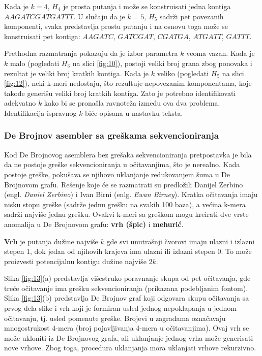 \documentclass[12pt,oneside]{memoir}
\begin{document}
Kada je $k = 4$, $H_4$ je prosta putanja i može se konstruisati jedna kontiga $AAGATCGATGATTT$. U slučaju da je $k = 5$, $H_5$ sadrži pet povezanih komponenti, svaka predstavlja prostu putanju i na osnovu toga može se konstruisati pet kontiga: $AAGATC$, $GATCGAT$, $CGATGA$, $ATGATT$, $GATTT$.

Prethodna razmatranja pokazuju da je izbor parametra $k$ veoma vazan. Kada je $k$ malo (pogledati $H_3$ na slici \ref{fig:10}), postoji veliki broj grana zbog ponovaka i rezultat je veliki broj kratkih kontiga. Kada je $k$ veliko (pogledati $H_5$ na slici \ref{fig:12}), neki k-meri nedostaju, što rezultuje nepovezanim komponentama, koje takođe generišu veliki broj kratkih kontiga. Zato je potrebno identifikovati adekvatno $k$ kako bi se pronašla ravnoteža između ova dva problema. Identifikacija ispravnog $k$ biće opisana u nastavku teksta.

\subsubsection{De Brojnov asembler sa greškama sekvencioniranja}

Kod De Brojnovog asemblera bez grešaka sekvencioniranja pretpostavka je bila da ne postoje greške sekvencioniranja u očitavanjima, što je nerealno. Kada postoje greške, pokušava se njihovo uklanjanje redukovanjem šuma u De Brojnovom grafu. Rešenje koje će se razmatrati su predložili Danijel Zerbino (engl. \textit{Daniel Zerbino}) i Ivan Birni (enlg. \textit{Ewan Birney}). Kratka očitavanja imaju nisku stopu greške (sadrže jednu grešku na svakih 100 baza), a većina k-mera sadrži najviše jednu grešku. Ovakvi k-meri sa greškom mogu kreirati dve vrste anomalija u De Brojnovom grafu: \textbf{vrh (špic)} i \textbf{mehurić}.

\textbf{Vrh} je putanja dužine najviše $k$ gde svi unutrašnji čvorovi imaju ulazni i izlazni stepen 1, dok jedan od njihovih krajeva ima ulazni ili izlazni stepen 0. To može proizvesti potencijalnu kontigu dužine najviše $2k$.

Slika \ref{fig:13}(a) predstavlja višestruko poravnanje skupa od pet očitavanja, gde treće očitavanje ima grešku sekvencioniranja (prikazana podebljanim fontom). Slika \ref{fig:13}(b) predstavlja De Brojnov graf koji odgovara skupu očitavanja sa prvog dela slike i vrh koji je formiran usled jednog nepoklapanja u jednom očitavanju, tj. usled pomenute greške. Brojevi u zagradama označavaju mnogostrukost 4-mera (broj pojavljivanja 4-mera u očitavanjima). Ovaj vrh se može ukloniti iz De Brojnovog grafa, ali uklanjanje jednog vrha može generisati nove vrhove. Zbog toga, procedura uklanjanja mora uklanjati vrhove rekurzivno.
\end{document}
